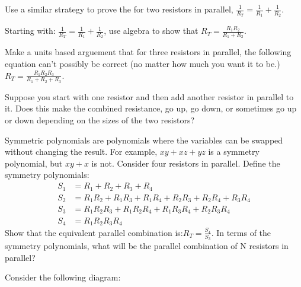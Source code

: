 \begin{clevel}
Use a similar strategy to prove the for two resistors in parallel, $\frac{1}{R_T}=\frac{1}{R_1}+\frac{1}{R_2}$.
\end{clevel}

\begin{clevel}
Starting with: $\frac{1}{R_T}=\frac{1}{R_1}+\frac{1}{R_2}$, use algebra to show that $R_T=\frac{R_1 R_2}{R_1+R_2}$.
\end{clevel}

\begin{blevel}
Make a units based arguement that for three resistors in parallel, the following equation can't possibly be correct (no matter how much you want it to be.) $R_T=\frac{R_1 R_2 R_3}{R_1+R_2+R_3}$.
\end{blevel}

\begin{blevel}
Suppose you start with one resistor and then add another resistor in parallel to it. Does this make the combined resistance, go up, go down, or sometimes go up or down depending on the sizes of the two resistors?
\end{blevel}

\begin{dlevel}
Symmetric polynomials are polynomials where the variables can be swapped without changing the result. For example, $xy+xz+yz$ is a symmetry polynomial, but $xy+x$ is not. Consider four resistors in parallel. Define the symmetry polynomials:
\begin{align}
S_1&=R_1+R_2+R_3+R_4 \\
S_2&=R_1R_2+R_1R_3+R_1R_4+R_2R_3+R_2R_4+R_3R_4\\
S_3&=R_1R_2R_3+R_1R_2R_4+R_1R_3R_4+R_2R_3R_4\\
S_4&=R_1R_2R_3R_4
\end{align}
Show that the equivalent parallel combination is:$R_T = \frac{S_4}{S_3}$. In terms of the symmetry polynomials, what will be the parallel combination of N resistors in parallel?
\end{dlevel}

Consider the following diagram:

